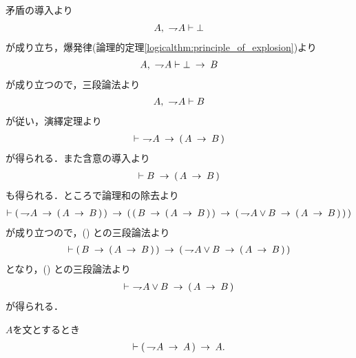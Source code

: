 	\begin{prf}
		矛盾の導入より
		\begin{align}
			A,\ \negation A \vdash \bot
		\end{align}
		が成り立ち，爆発律(論理的定理\ref{logicalthm:principle_of_explosion})より
		\begin{align}
			A,\ \negation A \vdash \bot \rarrow B
		\end{align}
		が成り立つので，三段論法より
		\begin{align}
			A,\ \negation A \vdash B
		\end{align}
		が従い，演繹定理より
		\begin{align}
			\vdash\ \negation A \rarrow (\, A \rarrow B\, )
			\label{fom:disjunction_of_negation_rewritable_by_implication_1}
		\end{align}
		が得られる．また含意の導入より
		\begin{align}
			\vdash B \rarrow (\, A \rarrow B\, )
			\label{fom:disjunction_of_negation_rewritable_by_implication_2}
		\end{align}
		も得られる．ところで論理和の除去より
		\begin{align}
			\vdash (\, \negation A \rarrow (\, A \rarrow B\, )\, )
			\rarrow (\, (\, B \rarrow (\, A \rarrow B\, )\, )
			\rarrow (\, \negation A \vee B \rarrow (\, A \rarrow B\, )\, )\, )
		\end{align}
		が成り立つので，()
		との三段論法より
		\begin{align}
			\vdash (\, B \rarrow (\, A \rarrow B\, )\, )
			\rarrow (\, \negation A \vee B \rarrow (\, A \rarrow B\, )\, )
		\end{align}
		となり，()
		との三段論法より
		\begin{align}
			\vdash\ \negation A \vee B \rarrow (\, A \rarrow B\, )
		\end{align}
		が得られる．
		\QED
	\end{prf}
	
	\begin{screen}
		\begin{thm}[驚嘆すべき帰結]\label{logicalthm:consequentia_mirabilis}
			$A$を文とするとき
			\begin{align}
				\vdash (\, \negation A \rarrow A\, ) \rarrow A.
			\end{align}
		\end{thm}
	\end{screen}
	
